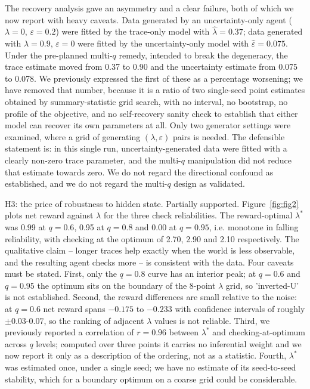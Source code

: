 \documentclass[11pt,a4paper]{article}
\begin{document}
The recovery analysis gave an asymmetry and a clear failure, both of which we now report with heavy caveats. Data generated by an uncertainty-only agent ($\lambda=0$, $\varepsilon=0.2$) were fitted by the trace-only model with $\hat{\lambda} = 0.37$; data generated with $\lambda=0.9$, $\varepsilon=0$ were fitted by the uncertainty-only model with $\hat{\varepsilon} = 0.075$. Under the pre-planned multi-$q$ remedy, intended to break the degeneracy, the trace estimate moved from 0.37 to 0.90 and the uncertainty estimate from 0.075 to 0.078. We previously expressed the first of these as a percentage worsening; we have removed that number, because it is a ratio of two single-seed point estimates obtained by summary-statistic grid search, with no interval, no bootstrap, no profile of the objective, and no self-recovery sanity check to establish that either model can recover its own parameters at all. Only two generator settings were examined, where a grid of generating $(\lambda, \varepsilon)$ pairs is needed. The defensible statement is: in this single run, uncertainty-generated data were fitted with a clearly non-zero trace parameter, and the multi-$q$ manipulation did not reduce that estimate towards zero. We do not regard the directional confound as established, and we do not regard the multi-$q$ design as validated.

H3: the price of robustness to hidden state. Partially supported. Figure~\ref{fig:fig2} plots net reward against $\lambda$ for the three check reliabilities. The reward-optimal $\lambda^{*}$ was 0.99 at $q=0.6$, 0.95 at $q=0.8$ and 0.00 at $q=0.95$, i.e. monotone in falling reliability, with checking at the optimum of 2.70, 2.90 and 2.10 respectively. The qualitative claim -- longer traces help exactly when the world is less observable, and the resulting agent checks more -- is consistent with the data. Four caveats must be stated. First, only the $q=0.8$ curve has an interior peak; at $q=0.6$ and $q=0.95$ the optimum sits on the boundary of the 8-point $\lambda$ grid, so 'inverted-U' is not established. Second, the reward differences are small relative to the noise: at $q=0.6$ net reward spans $-0.175$ to $-0.233$ with confidence intervals of roughly $\pm 0.03$-$0.07$, so the ranking of adjacent $\lambda$ values is not reliable. Third, we previously reported a correlation of $r=0.96$ between $\lambda^{*}$ and checking-at-optimum across $q$ levels; computed over three points it carries no inferential weight and we now report it only as a description of the ordering, not as a statistic. Fourth, $\lambda^{*}$ was estimated once, under a single seed; we have no estimate of its seed-to-seed stability, which for a boundary optimum on a coarse grid could be considerable.
\end{document}
